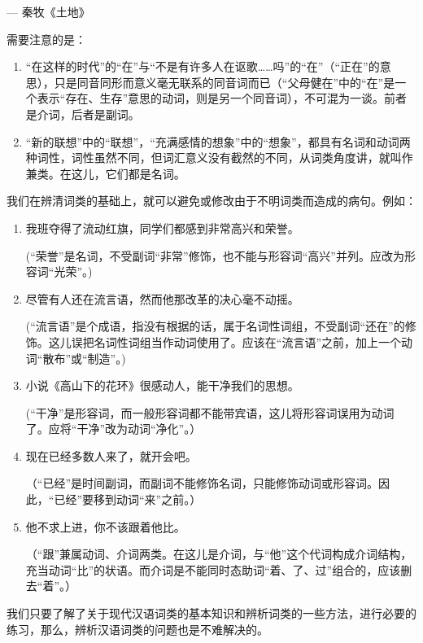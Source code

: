 \begin{flushright}
    --- 秦牧《土地》
\end{flushright}

需要注意的是：

\begin{enumerate}[label=\textcircled{\arabic*}]
    \item  “在这样的时代”的“在”与“不是有许多人在讴歌……吗”的“在”（“正在”的意思），只是同音同形而意义毫无联系的同音词而已（“父母健在”中的“在”是一个表示“存在、生存”意思的动词，则是另一个同音词），不可混为一谈。前者是介词，后者是副词。

    \item “新的联想”中的“联想”，“充满感情的想象”中的“想象”，都具有名词和动词两种词性，词性虽然不同，但词汇意义没有截然的不同，从词类角度讲，就叫作兼类。在这儿，它们都是名词。
\end{enumerate}

我们在辨清词类的基础上，就可以避免或修改由于不明词类而造成的病句。例如：

\begin{enumerate}[label=(\arabic*)]
    \item 我班夺得了流动红旗，同学们都感到非常高兴和荣誉。

(“荣誉”是名词，不受副词“非常”修饰，也不能与形容词“高兴”并列。应改为形容词“光荣”。)
\newpage

    \item 尽管有人还在流言语，然而他那改革的决心毫不动摇。

(“流言语”是个成语，指没有根据的话，属于名词性词组，不受副词“还在”的修饰。这儿误把名词性词组当作动词使用了。应该在“流言语”之前，加上一个动词“散布”或“制造”。)

    \item 小说《高山下的花环》很感动人，能干净我们的思想。

(“干净”是形容词，而一般形容词都不能带宾语，这儿将形容词误用为动词了。应将“干净”改为动词“净化”。）

    \item 现在已经多数人来了，就开会吧。

（“已经”是时间副词，而副词不能修饰名词，只能修饰动词或形容词。因此，“已经”要移到动词“来”之前。）

    \item 他不求上进，你不该跟着他比。

（“跟”兼属动词、介词两类。在这儿是介词，与“他”这个代词构成介词结构，充当动词“比”的状语。而介词是不能同时态助词“着、了、过”组合的，应该删去“着”。）
\end{enumerate}

我们只要了解了关于现代汉语词类的基本知识和辨析词类的一些方法，进行必要的练习，那么，辨析汉语词类的问题也是不难解决的。
\newpage
